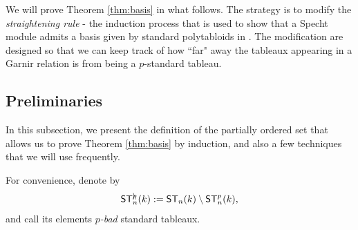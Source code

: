 \documentclass[a4paper]{amsart}
\numberwithin{equation}{subsection}
\theoremstyle{definition}
\newcommand{\ST}{\mathsf{ST}}
\newcommand{\pbad}{\ST^{\mathrlap{\backslash}p}}
\numberwithin{equation}{subsection}
\begin{document}
We will prove Theorem \ref{thm:basis} in what follows.
The strategy is to modify the \emph{straightening rule} - the induction process that is used to show that a Specht module admits a basis given by standard polytabloids in \cite{Pe}.  The modification are designed so that we can keep track of how ``far" away the tableaux appearing in a Garnir relation is from being a $p$-standard tableau.

\subsection{Preliminaries}\label{subsec:basisprelim}
In this subsection, we present the definition of the partially ordered set that allows us to prove Theorem \ref{thm:basis} by induction, and also a few techniques that we will use frequently.

For convenience, denote by
\[
\pbad_n(k) := \ST_n(k)\setminus \ST_n^p(k),
\]
and call its elements \emph{$p$-bad} standard tableaux.
\end{document}
